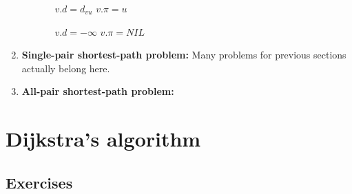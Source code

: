\documentclass{book}
\begin{document}
\begin{enumerate}
\begin{enumerate}
\begin{itemize}
\begin{algorithm}[h!]
\begin{algorithmic}[1]
				\end{algorithmic}
			\end{algorithm}
			\begin{algorithm}[h!]
				\begin{algorithmic}[1]
							\State $v.d = d_{vu}$
							\State $v.\pi = u$
						\EndIf
					\EndFunction
				\end{algorithmic}
			\end{algorithm}
			\begin{algorithm}[h!]
				\begin{algorithmic}
							\State $v.d = -\infty$
							\State $v.\pi = NIL$
						\EndFor
					\EndFunction
				\end{algorithmic}
			\end{algorithm}
			\FloatBarrier			
		\end{itemize}
	\end{enumerate}
	\item \textbf{Single-pair shortest-path problem:}
	Many problems for previous sections actually belong here.
	\item \textbf{All-pair shortest-path problem:}
	\end{enumerate}
	\section{Dijkstra's algorithm}
	\subsection{Exercises}
\end{document}
